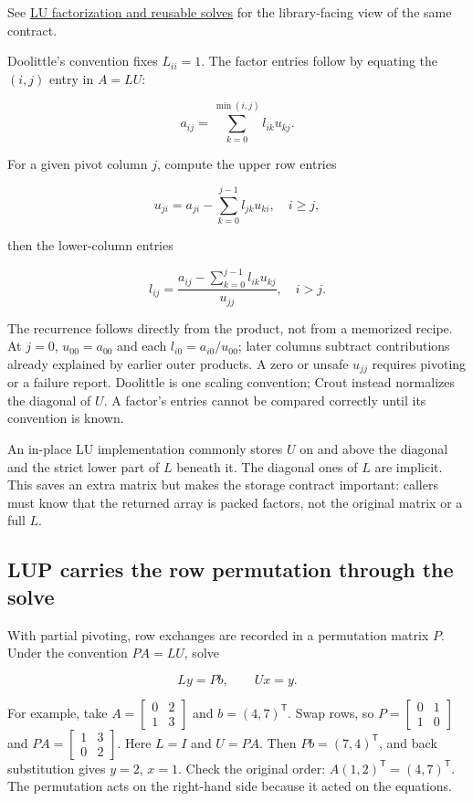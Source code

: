 See \hyperref[01-foundations-i-ch019-a-runnable-pivoted-lu-reference-preserves-the-elimination-history]{LU factorization and reusable solves} for the library-facing view of the same contract.

Doolittle's convention fixes \(L_{ii}=1\). The factor entries follow by equating the \((i,j)\) entry in \(A=LU\):

\[
a_{ij}=\sum_{k=0}^{\min(i,j)} l_{ik}u_{kj}.
\]

For a given pivot column \(j\), compute the upper row entries

\[
u_{ji}=a_{ji}-\sum_{k=0}^{j-1}l_{jk}u_{ki},\quad i\ge j,
\]

then the lower-column entries

\[
l_{ij}=\frac{a_{ij}-\sum_{k=0}^{j-1}l_{ik}u_{kj}}{u_{jj}},\quad i>j.
\]

The recurrence follows directly from the product, not from a memorized recipe. At \(j=0\), \(u_{00}=a_{00}\) and each \(l_{i0}=a_{i0}/u_{00}\); later columns subtract contributions already explained by earlier outer products. A zero or unsafe \(u_{jj}\) requires pivoting or a failure report. Doolittle is one scaling convention; Crout instead normalizes the diagonal of \(U\). A factor's entries cannot be compared correctly until its convention is known.

An in-place LU implementation commonly stores \(U\) on and above the diagonal and the strict lower part of \(L\) beneath it. The diagonal ones of \(L\) are implicit. This saves an extra matrix but makes the storage contract important: callers must know that the returned array is packed factors, not the original matrix or a full \(L\).

\subsection{LUP carries the row permutation through the solve}\label{01-foundations-i-ch019-lup-carries-the-row-permutation-through-the-solve}

With partial pivoting, row exchanges are recorded in a permutation matrix \(P\). Under the convention \(PA=LU\), solve

\[
Ly=Pb,\qquad Ux=y.
\]

For example, take \(A=\begin{bmatrix}0&2\\1&3\end{bmatrix}\) and \(b=(4,7)^\mathsf T\). Swap rows, so \(P=\begin{bmatrix}0&1\\1&0\end{bmatrix}\) and \(PA=\begin{bmatrix}1&3\\0&2\end{bmatrix}\). Here \(L=I\) and \(U=PA\). Then \(Pb=(7,4)^\mathsf T\), and back substitution gives \(y=2\), \(x=1\). Check the original order: \(A(1,2)^\mathsf T=(4,7)^\mathsf T\). The permutation acts on the right-hand side because it acted on the equations.

